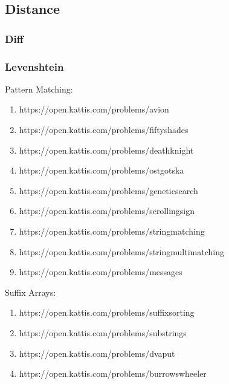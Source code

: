 \subsection{Distance}
\subsubsection{Diff}
\subsubsection{Levenshtein}

\hrulefill

Pattern Matching:
\begin{enumerate}
\item https://open.kattis.com/problems/avion
\item https://open.kattis.com/problems/fiftyshades
\item https://open.kattis.com/problems/deathknight
\item https://open.kattis.com/problems/ostgotska
\item https://open.kattis.com/problems/geneticsearch
\item https://open.kattis.com/problems/scrollingsign
\item https://open.kattis.com/problems/stringmatching
\item https://open.kattis.com/problems/stringmultimatching
\item https://open.kattis.com/problems/messages
\end{enumerate}

Suffix Arrays:
\begin{enumerate}
\item https://open.kattis.com/problems/suffixsorting
\item https://open.kattis.com/problems/substrings
\item https://open.kattis.com/problems/dvaput
\item https://open.kattis.com/problems/burrowswheeler
\end{enumerate}
